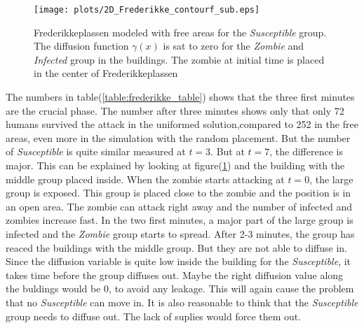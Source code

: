 \documentclass[%
twoside,                 %
final,                   %
10pt]{article}
\begin{document}
\begin{figure}[ht]
  \centerline{\texttt{[image: plots/2D\_Frederikke\_contourf\_sub.eps]}}
  \caption{
  \label{fig:frederikke_free_area} Frederikkeplassen modeled with free areas for the \emph{Susceptible} group. The diffusion function $\gamma(x)$ is sat to zero for the \emph{Zombie} and \emph{Infected} group in the buildings. The zombie at initial time is placed in the center of Frederikkeplassen
  }
\end{figure}


The numbers in table(\ref{table:frederikke_table}) shows that the three first minutes are the crucial phase. The number after three minutes shows only that only 72 humans survived the attack in the uniformed solution,compared to 252 in the free areas, even more in the simulation with the random placement. But the number of \emph{Susceptible} is quite similar measured at $t=3$. But at $t=7$, the difference is major. This can be explained by looking at figure(\ref{fig:frederikke_free_area}) and the building with the middle group placed inside. When the zombie starts attacking at $t=0$, the large group is exposed. This group is placed close to the zombie and the position is in an open area. The zombie can attack right away and the number of infected and zombies increase fast. In the two first minutes, a major part of the large group is infected and the \emph{Zombie} group starts to spread. After 2-3 minutes, the group has reaced the buildings with the middle group. But they are not able to diffuse in. Since the diffusion variable is quite low inside the building for the \emph{Susceptible}, it takes time before the group diffuses out. Maybe the right diffusion value along the buldings would be 0, to avoid any leakage. This will again cause the problem that no \emph{Susceptible} can move in. It is also reasonable to think that the \emph{Susceptible} group needs to diffuse out. The lack of suplies would force them out.




\label{table:frederikke_table}
\end{document}
